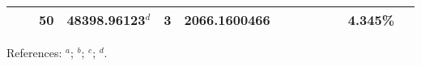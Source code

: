 \begin{table*}
\begin{center}
{\begin{tabular}{:l;l;c;l;c;l;c;l;l;c;c;c;c}
\rowstyle{\itshape}               &        & 50        & 48398.96123$^{d}$                & 3 &  2066.1600466      &      & $                                        $ & $                                        $ &             &              & 4.345\%   & $     ^{}     $\\
\hline
\end{tabular}
}
{\footnotesize References:
$^{a}$\citet{Aldenius:2009:014008};
$^{b}$\citet{Pickering:2000:163};
$^{c}$\citet{Nave:2012:1570};
$^{d}$\citet{Berengut:2011:052520}.}
\end{center}
\end{table*}

